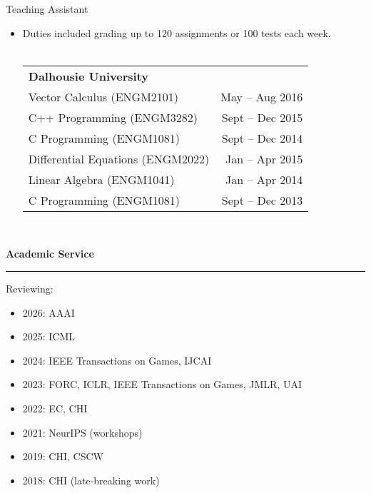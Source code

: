 \documentclass{article}
\newcommand{\heading}[1]
{
	\vspace{3pt}
	{\bf #1} 
	\vspace{-6pt}
	
	\rule{\linewidth}{0.4pt}
}
\begin{document}
Teaching Assistant
\begin{itemize}
	\item Duties included grading up to 120 assignments or 100 tests each week. \\~\\
	\begin{tabularx}{\linewidth}{Xr}
		\textbf{Dalhousie University}	\\
		Vector Calculus (ENGM2101) & May -- Aug 2016 \\
		C++ Programming (ENGM3282) & Sept -- Dec 2015 \\
		C Programming (ENGM1081) & Sept -- Dec 2014 \\
		Differential Equations (ENGM2022) & Jan -- Apr 2015 \\
		Linear Algebra (ENGM1041) & Jan -- Apr 2014 \\
		C Programming (ENGM1081) & Sept -- Dec 2013 \\
	\end{tabularx} ~\\
\end{itemize}


\heading{Academic Service}
Reviewing:
\begin{itemize}
	  \item 2026: AAAI
	  \item 2025: ICML
    \item 2024: IEEE Transactions on Games, IJCAI
    \item 2023: FORC, ICLR, IEEE Transactions on Games, JMLR, UAI
    \item 2022: EC, CHI
    \item 2021: NeurIPS (workshops)
    \item 2019: CHI, CSCW
    \item 2018: CHI (late-breaking work)
\end{itemize}
\end{document}
